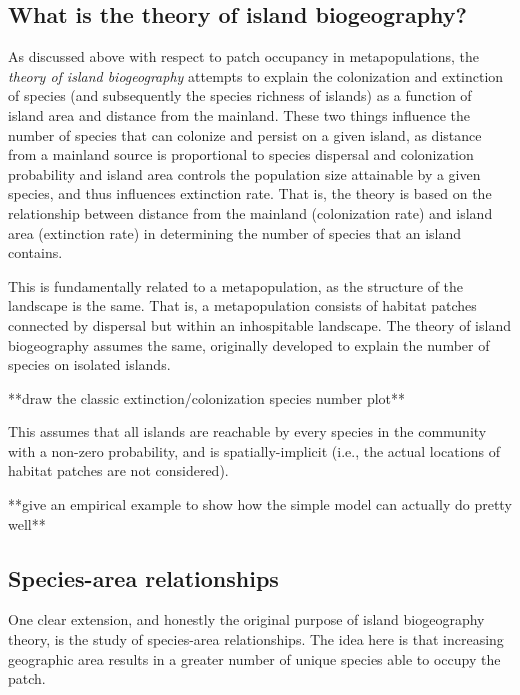 \documentclass[12pt]{article}
\begin{document}
\bigskip
\subsection*{What is the theory of island biogeography?}

As discussed above with respect to patch occupancy in metapopulations, the \textit{theory of island biogeography} attempts to explain the colonization and extinction of species (and subsequently the species richness of islands) as a function of island area and distance from the mainland. These two things influence the number of species that can colonize and persist on a given island, as distance from a mainland source is proportional to species dispersal and colonization probability and island area controls the population size attainable by a given species, and thus influences extinction rate. That is, the theory is based on the relationship between distance from the mainland (colonization rate) and island area (extinction rate) in determining the number of species that an island contains. 

This is fundamentally related to a metapopulation, as the structure of the landscape is the same. That is, a metapopulation consists of habitat patches connected by dispersal but within an inhospitable landscape. The theory of island biogeography assumes the same, originally developed to explain the number of species on isolated islands. 




**draw the classic extinction/colonization species number plot**





This assumes that all islands are reachable by every species in the community with a non-zero probability, and is spatially-implicit (i.e., the actual locations of habitat patches are not considered). 



**give an empirical example to show how the simple model can actually do pretty well**









\bigskip
\subsection*{Species-area relationships}

One clear extension, and honestly the original purpose of island biogeography theory, is the study of species-area relationships. The idea here is that increasing geographic area results in a greater number of unique species able to occupy the patch. 
\end{document}
